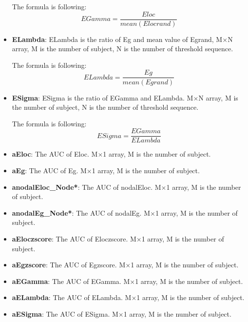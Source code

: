 \documentclass[11pt]{article}
\begin{document}
\begin{itemize}
						The formula is following:
						$$EGamma=\frac{Eloc}{mean(Elocrand)}$$
					\item \textbf{ELambda}: ELambda is the ratio of Eg and mean value of Egrand,
						M$\times$N array, M is the number of subject, N is the number of threshold sequence.
						
						The formula is following:
						$$ELambda=\frac{Eg}{mean(Egrand)}$$
					\item \textbf{ESigma}: ESigma is the ratio of EGamma and ELambda.
						M$\times$N array, M is the number of subject, N is the number of threshold sequence.

						The formula is following:
						$$ESigma=\frac{EGamma}{ELambda}$$
					\item \textbf{aEloc}: The AUC of Eloc.
						M$\times$1 array, M is the number of subject.
					\item \textbf{aEg}: The AUC of Eg.
						M$\times$1 array, M is the number of subject.
					\item \textbf{anodalEloc\_Node*}: The AUC of nodalEloc.
						M$\times$1 array, M is the number of subject.
					\item \textbf{anodalEg\_Node*}: The AUC of nodalEg.
						M$\times$1 array, M is the number of subject.
					\item \textbf{aEloczscore}: The AUC of Eloczscore.
						M$\times$1 array, M is the number of subject.
					\item \textbf{aEgzscore}: The AUC of Egzscore.
						M$\times$1 array, M is the number of subject.
					\item \textbf{aEGamma}: The AUC of EGamma.
						M$\times$1 array, M is the number of subject.
					\item \textbf{aELambda}: The AUC of ELambda.
						M$\times$1 array, M is the number of subject.
					\item \textbf{aESigma}: The AUC of ESigma.
						M$\times$1 array, M is the number of subject.
				\end{itemize}
\end{document}
